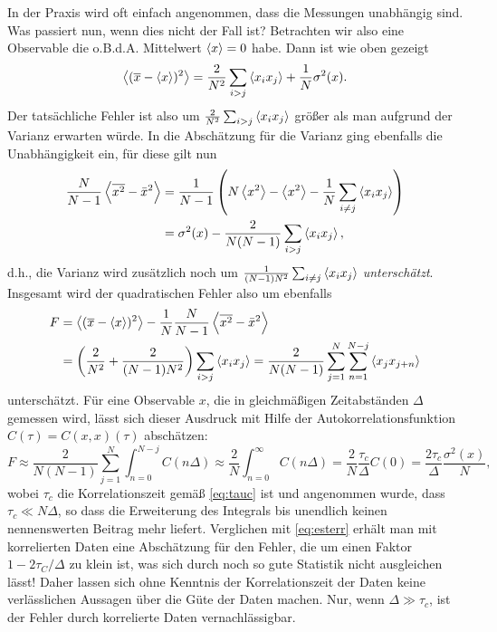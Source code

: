 In der Praxis wird oft einfach angenommen, dass die Messungen
unabhängig sind. Was passiert nun, wenn dies nicht der Fall ist?
Betrachten wir also eine Observable die o.B.d.A. Mittelwert $\left\langle{x}\right\rangle
= 0$ habe. Dann ist wie oben gezeigt
\begin{align}
  \left\langle{(\overline{x} - \left\langle{x}\right\rangle)^2}\right\rangle
  = \frac{2}{N^2}\sum_{i > j} \left\langle{x_ix_j}\right\rangle
  + \frac{1}{N}\sigma^2(x).
\end{align}
Der tatsächliche Fehler ist also um $\frac{2}{N^2}\sum_{i > j}
\left\langle{x_ix_j}\right\rangle$ größer als man aufgrund der Varianz erwarten würde. In
die Abschätzung für die Varianz ging ebenfalls die Unabhängigkeit ein,
für diese gilt nun
\begin{align}
  \frac{N}{N-1}\left\langle{\overline{x^2} - \bar{x}^2}\right\rangle
  &= \frac{1}{N-1}\left(N\left\langle{x^2}\right\rangle - \left\langle{x^2}\right\rangle
    - \frac{1}{N}\sum_{i\neq j} \left\langle{x_ix_j}\right\rangle\right)\\
  &= \sigma^2(x) - \frac{2}{N(N-1)}\sum_{i> j} \left\langle{x_ix_j}\right\rangle,
\end{align}
d.h., die Varianz wird zusätzlich noch um
$\frac{1}{(N-1)N^2}\sum_{i\neq j} \left\langle{x_ix_j}\right\rangle$
\emph{unterschätzt}. Insgesamt wird der quadratischen Fehler also
um ebenfalls
\begin{align}
  F&=\left\langle{(\overline{x} - \left\langle{x}\right\rangle)^2}\right\rangle -
  \frac{1}{N}\frac{N}{N-1}\left\langle{\overline{x^2} - \bar{x}^2}\right\rangle\nonumber\\
  &=
  \left(\frac{2}{N^2} + \frac{2}{(N-1)N^2}\right)\sum_{i > j} \left\langle{x_ix_j}\right\rangle
  =
  \frac{2}{N(N-1)}\sum_{j=1}^{N}\sum_{n = 1}^{N-j} \left\langle{x_jx_{j+n}}\right\rangle
\end{align}
unterschätzt. Für eine Observable $x$, die in gleichmäßigen
Zeitabständen $\Delta$ gemessen wird, lässt sich dieser Ausdruck mit
Hilfe der Autokorrelationsfunktion $C(\tau) = C(x,x)(\tau)$
abschätzen:
\begin{equation}
  \label{eq:correrrest}
  F
  \approx
  \frac{2}{N(N-1)}\sum_{j=1}^{N}\int_{n = 0}^{N-j} C(n\Delta)
  \approx
  \frac{2}{N}\int_{n = 0}^{\infty} C(n\Delta)
  =
  \frac{2}{N}\frac{\tau_c}{\Delta} C(0)
  =
  \frac{2\tau_c}{\Delta}\frac{\sigma^2(x)}{N},
\end{equation}
wobei $\tau_c$ die Korrelationszeit gemäß \eqref{eq:tauc} ist und
angenommen wurde, dass $\tau_c\ll N\Delta$, so dass die Erweiterung
des Integrals bis unendlich keinen nennenswerten Beitrag mehr liefert.
Verglichen mit \eqref{eq:esterr} erhält man mit korrelierten Daten
eine Abschätzung für den Fehler, die um einen Faktor
$1-2\tau_C/\Delta$ zu klein ist, was sich durch noch so gute Statistik
nicht ausgleichen lässt! Daher lassen sich ohne Kenntnis der
Korrelationszeit der Daten keine verlässlichen Aussagen über die Güte
der Daten machen. Nur, wenn $\Delta\gg\tau_c$, ist der Fehler durch
korrelierte Daten vernachlässigbar.

